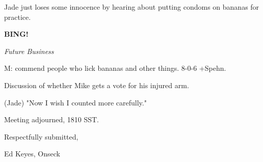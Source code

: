 \documentclass[12pt]{article}
\newcommand{\bing}{{\bf BING!} }
\newcommand{\goto}[1]{\bing \vskip 12pt \centerline{{\em{#1}}}}
\begin{document}
Jade just loses some innocence by hearing about putting condoms on bananas for practice.

\goto{Future Business}

M: commend people who lick bananas and other things. 8-0-6 +Spehn.

Discussion of whether Mike gets a vote for his injured arm.

(Jade) "Now I wish I counted more carefully."

\vspace{12pt}

\noindent
Meeting adjourned, 1810 SST.

\vspace{18pt}

\centerline{Respectfully submitted,}
\centerline{Ed Keyes, Onseck}
\end{document}
